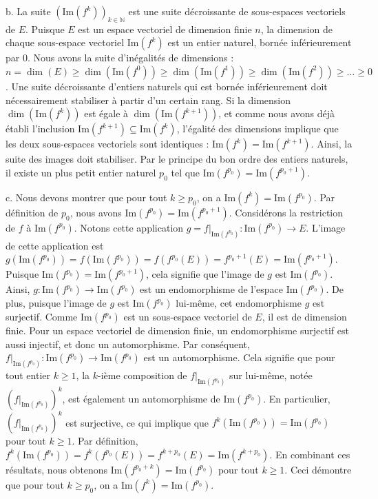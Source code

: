 \documentclass{report}
\begin{document}
    b.  La suite $(\text{Im}(f^k))_{k \in \mathbb{N}}$ est une suite décroissante de sous-espaces vectoriels de $E$.
        Puisque $E$ est un espace vectoriel de dimension finie $n$, la dimension de chaque sous-espace vectoriel $\text{Im}(f^k)$ est un entier naturel, bornée inférieurement par 0.
        Nous avons la suite d'inégalités de dimensions :
        $n = \dim(E) \ge \dim(\text{Im}(f^0)) \ge \dim(\text{Im}(f^1)) \ge \dim(\text{Im}(f^2)) \ge \dots \ge 0$.
        Une suite décroissante d'entiers naturels qui est bornée inférieurement doit nécessairement stabiliser à partir d'un certain rang.
        Si la dimension $\dim(\text{Im}(f^k))$ est égale à $\dim(\text{Im}(f^{k+1}))$, et comme nous avons déjà établi l'inclusion $\text{Im}(f^{k+1}) \subseteq \text{Im}(f^k)$, l'égalité des dimensions implique que les deux sous-espaces vectoriels sont identiques : $\text{Im}(f^k) = \text{Im}(f^{k+1})$.
        Ainsi, la suite des images doit stabiliser. Par le principe du bon ordre des entiers naturels, il existe un plus petit entier naturel $p_0$ tel que $\text{Im}(f^{p_0}) = \text{Im}(f^{p_0+1})$.

    c.  Nous devons montrer que pour tout $k \ge p_0$, on a $\text{Im}(f^k) = \text{Im}(f^{p_0})$.
        Par définition de $p_0$, nous avons $\text{Im}(f^{p_0}) = \text{Im}(f^{p_0+1})$.
        Considérons la restriction de $f$ à $\text{Im}(f^{p_0})$. Notons cette application $g = f|_{\text{Im}(f^{p_0})} : \text{Im}(f^{p_0}) \to E$.
        L'image de cette application est $g(\text{Im}(f^{p_0})) = f(\text{Im}(f^{p_0})) = f(f^{p_0}(E)) = f^{p_0+1}(E) = \text{Im}(f^{p_0+1})$.
        Puisque $\text{Im}(f^{p_0}) = \text{Im}(f^{p_0+1})$, cela signifie que l'image de $g$ est $\text{Im}(f^{p_0})$.
        Ainsi, $g: \text{Im}(f^{p_0}) \to \text{Im}(f^{p_0})$ est un endomorphisme de l'espace $\text{Im}(f^{p_0})$.
        De plus, puisque l'image de $g$ est $\text{Im}(f^{p_0})$ lui-même, cet endomorphisme $g$ est surjectif.
        Comme $\text{Im}(f^{p_0})$ est un sous-espace vectoriel de $E$, il est de dimension finie. Pour un espace vectoriel de dimension finie, un endomorphisme surjectif est aussi injectif, et donc un automorphisme.
        Par conséquent, $f|_{\text{Im}(f^{p_0})} : \text{Im}(f^{p_0}) \to \text{Im}(f^{p_0})$ est un automorphisme.
        Cela signifie que pour tout entier $k \ge 1$, la $k$-ième composition de $f|_{\text{Im}(f^{p_0})}$ sur lui-même, notée $(f|_{\text{Im}(f^{p_0})})^k$, est également un automorphisme de $\text{Im}(f^{p_0})$.
        En particulier, $(f|_{\text{Im}(f^{p_0})})^k$ est surjective, ce qui implique que $f^k(\text{Im}(f^{p_0})) = \text{Im}(f^{p_0})$ pour tout $k \ge 1$.
        Par définition, $f^k(\text{Im}(f^{p_0})) = f^k(f^{p_0}(E)) = f^{k+p_0}(E) = \text{Im}(f^{k+p_0})$.
        En combinant ces résultats, nous obtenons $\text{Im}(f^{p_0+k}) = \text{Im}(f^{p_0})$ pour tout $k \ge 1$.
        Ceci démontre que pour tout $k \ge p_0$, on a $\text{Im}(f^k) = \text{Im}(f^{p_0})$.
\end{document}
